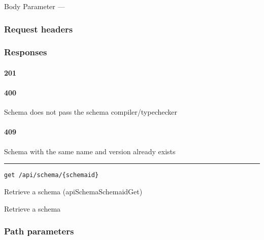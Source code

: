 {Body Parameter} ---

\hypertarget{request-headers-75}{%
\subsubsection{Request headers}\label{request-headers-75}}

\hypertarget{responses-143}{%
\subsubsection{Responses}\label{responses-143}}

\hypertarget{section-461}{%
\paragraph{201}\label{section-461}}

\protect\hyperlink{}{}

\hypertarget{section-462}{%
\paragraph{400}\label{section-462}}

Schema does not pass the schema compiler/typechecker
\protect\hyperlink{}{}

\hypertarget{section-463}{%
\paragraph{409}\label{section-463}}

Schema with the same name and version already exists
\protect\hyperlink{}{}

\begin{center}\rule{0.5\linewidth}{\linethickness}\end{center}

\protect\hypertarget{apiSchemaSchemaidGet}{}{}

\begin{verbatim}
get /api/schema/{schemaid}
\end{verbatim}

Retrieve a schema ({apiSchemaSchemaidGet})

Retrieve a schema

\hypertarget{path-parameters-77}{%
\subsubsection{Path parameters}\label{path-parameters-77}}

